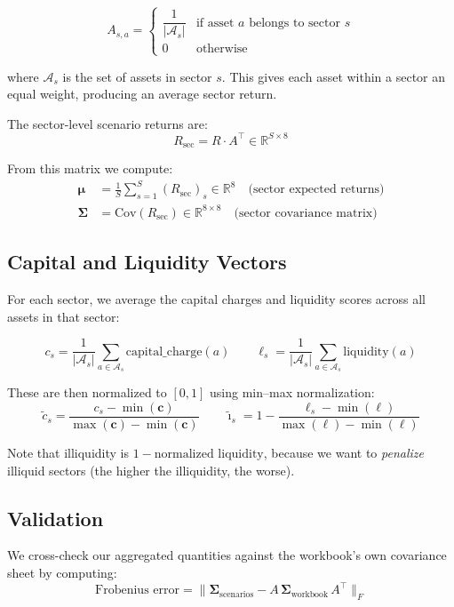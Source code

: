 \documentclass[12pt, a4paper]{article}
\begin{document}
\[
A_{s,a} = \begin{cases}
\dfrac{1}{|\mathcal{A}_s|} & \text{if asset } a \text{ belongs to sector } s \\[6pt]
0 & \text{otherwise}
\end{cases}
\]

where $\mathcal{A}_s$ is the set of assets in sector $s$. This gives each
asset within a sector an equal weight, producing an average sector return.

The sector-level scenario returns are:
\[
R_{\text{sec}} = R \cdot A^\top \in \mathbb{R}^{S \times 8}
\]

From this matrix we compute:
\begin{align}
\bm{\mu} &= \frac{1}{S} \sum_{s=1}^{S} (R_{\text{sec}})_s \in \mathbb{R}^8
    \quad \text{(sector expected returns)} \\[6pt]
\bm{\Sigma} &= \text{Cov}(R_{\text{sec}}) \in \mathbb{R}^{8 \times 8}
    \quad \text{(sector covariance matrix)}
\end{align}

\subsection{Capital and Liquidity Vectors}

For each sector, we average the capital charges and liquidity scores across all
assets in that sector:

\[
c_s = \frac{1}{|\mathcal{A}_s|} \sum_{a \in \mathcal{A}_s} \text{capital\_charge}(a)
\qquad
\ell_s = \frac{1}{|\mathcal{A}_s|} \sum_{a \in \mathcal{A}_s} \text{liquidity}(a)
\]

These are then normalized to $[0, 1]$ using min--max normalization:
\[
\tilde{c}_s = \frac{c_s - \min(\mathbf{c})}{\max(\mathbf{c}) - \min(\mathbf{c})}
\qquad
\tilde{\imath}_s = 1 - \frac{\ell_s - \min(\bm{\ell})}{\max(\bm{\ell}) - \min(\bm{\ell})}
\]

Note that illiquidity is $1 - \text{normalized liquidity}$, because we want to
\textit{penalize} illiquid sectors (the higher the illiquidity, the worse).

\subsection{Validation}

We cross-check our aggregated quantities against the workbook's own covariance
sheet by computing:
\[
\text{Frobenius error} = \| \bm{\Sigma}_{\text{scenarios}} - A\, \bm{\Sigma}_{\text{workbook}}\, A^\top \|_F
\]
\end{document}
